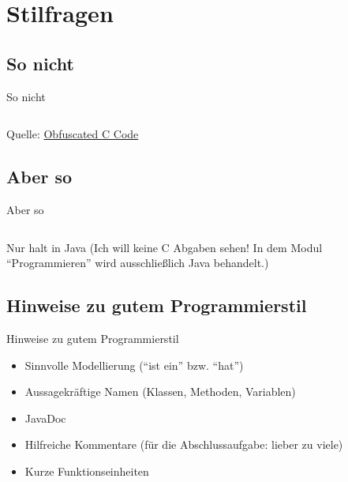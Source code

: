 \section{Stilfragen}
\subsection{So nicht}
\begin{frame}{So nicht}
    \inputminted[linenos, numbersep=5pt, tabsize=4, frame=lines, label=pi.c, fontsize=\tiny]{c}{pi.c}
    Quelle: \href{http://www.cise.ufl.edu/~manuel/obfuscate/obfuscate.html}{Obfuscated C Code}
\end{frame}

\subsection{Aber so}
\begin{frame}{Aber so}
    \inputminted[linenos, numbersep=5pt, tabsize=4, frame=lines, label=pi-good.c]{c}{pi-good.c}

    Nur halt in Java (Ich will keine C Abgaben sehen! In dem
    Modul "`Programmieren"' wird ausschließlich Java behandelt.)
\end{frame}

\subsection{Hinweise zu gutem Programmierstil}
\begin{frame}{Hinweise zu gutem Programmierstil}
    \begin{itemize}
        \item Sinnvolle Modellierung ("`ist ein"' bzw. "`hat"')
        \item Aussagekräftige Namen (Klassen, Methoden, Variablen)
        \item JavaDoc
        \item Hilfreiche Kommentare (für die Abschlussaufgabe: lieber zu viele)
        \item Kurze Funktionseinheiten
    \end{itemize}
\end{frame}
